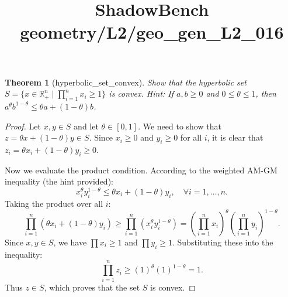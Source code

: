 \documentclass{article}
\title{ShadowBench geometry/L2/geo\_gen\_L2\_016}
\newtheorem{theorem}{Theorem}
\begin{document}
\maketitle

\begin{theorem}[hyperbolic_set_convex]
Show that the hyperbolic set $S = \{x \in \mathbb{R}_+^n \mid \prod_{i=1}^n x_i \ge 1\}$ is convex. 
\textit{Hint:} If $a, b \ge 0$ and $0 \le \theta \le 1$, then $a^\theta b^{1-\theta} \le \theta a + (1-\theta)b$.
\end{theorem}

\begin{proof}
Let $x, y \in S$ and let $\theta \in [0, 1]$. We need to show that $z = \theta x + (1-\theta)y \in S$.
Since $x_i \ge 0$ and $y_i \ge 0$ for all $i$, it is clear that $z_i = \theta x_i + (1-\theta)y_i \ge 0$.

Now we evaluate the product condition. According to the weighted AM-GM inequality (the hint provided):
\[ x_i^\theta y_i^{1-\theta} \le \theta x_i + (1-\theta)y_i, \quad \forall i = 1, \dots, n. \]
Taking the product over all $i$:
\[ \prod_{i=1}^n (\theta x_i + (1-\theta)y_i) \ge \prod_{i=1}^n \left( x_i^\theta y_i^{1-\theta} \right) = \left( \prod_{i=1}^n x_i \right)^\theta \left( \prod_{i=1}^n y_i \right)^{1-\theta}. \]
Since $x, y \in S$, we have $\prod x_i \ge 1$ and $\prod y_i \ge 1$. Substituting these into the inequality:
\[ \prod_{i=1}^n z_i \ge (1)^\theta (1)^{1-\theta} = 1. \]
Thus $z \in S$, which proves that the set $S$ is convex.
\end{proof}
\end{document}
